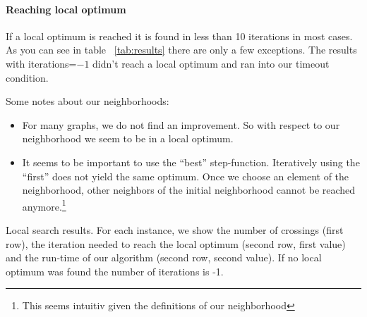 \documentclass{scrartcl}
\begin{document}
\paragraph{Reaching local optimum}
If a local optimum is reached it is found in less than 10 iterations in most cases.
As you can see in table ~\ref{tab:results} there are only a few exceptions.
The results with iterations=$-1$ didn't reach a local optimum and ran into our
timeout condition.





Some notes about our neighborhoods:

\begin{itemize}
  \item For many graphs, we do not find an improvement. So with respect to our neighborhood we
  seem to be in a local optimum. 
  \item It seems to be important to use the ``best''
    step-function. Iteratively using the ``first'' does not yield the
    same optimum. Once we choose an element of the neighborhood, other
    neighbors of the initial neighborhood cannot be reached
    anymore.\footnote{This seems intuitiv given the definitions of our
      neighborhood}
\end{itemize}





\begin{landscape}
\begin{table}
  \scriptsize
  
\caption{Local search results. For each instance, we show the number of crossings (first row), the iteration 
needed to reach the local optimum (second row, first value) and the run-time of our algorithm (second row, second value).
If no local optimum was found the number of iterations is -1. }
\label{tab:results}
\end{table}
\end{landscape}
\end{document}
